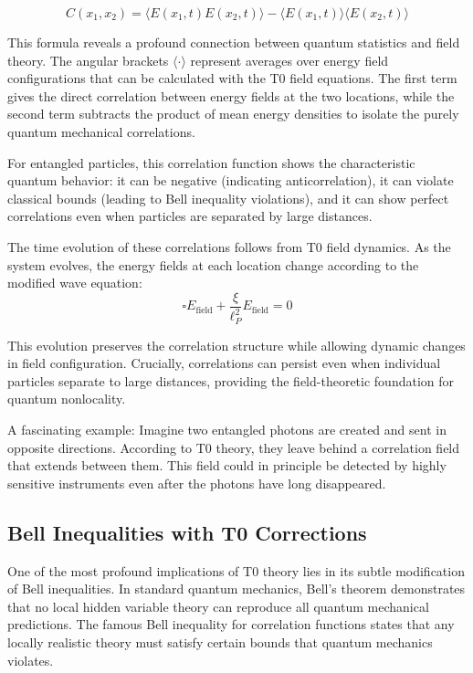 \documentclass[12pt,a4paper]{article}
\newcommand{\xipar}{\xi}
\theoremstyle{definition}
\theoremstyle{remark}
\begin{document}
\begin{equation}
	C(x_1,x_2) = \langle E(x_1,t) E(x_2,t) \rangle - \langle E(x_1,t) \rangle \langle E(x_2,t) \rangle
	\label{eq:field_correlation_function}
\end{equation}

This formula reveals a profound connection between quantum statistics and field theory. The angular brackets $\langle \cdot \rangle$ represent averages over energy field configurations that can be calculated with the T0 field equations. The first term gives the direct correlation between energy fields at the two locations, while the second term subtracts the product of mean energy densities to isolate the purely quantum mechanical correlations.

For entangled particles, this correlation function shows the characteristic quantum behavior: it can be negative (indicating anticorrelation), it can violate classical bounds (leading to Bell inequality violations), and it can show perfect correlations even when particles are separated by large distances.

The time evolution of these correlations follows from T0 field dynamics. As the system evolves, the energy fields at each location change according to the modified wave equation:
$$\square E_{\text{field}} + \frac{\xipar}{\ell_P^2} E_{\text{field}} = 0$$

This evolution preserves the correlation structure while allowing dynamic changes in field configuration. Crucially, correlations can persist even when individual particles separate to large distances, providing the field-theoretic foundation for quantum nonlocality.

A fascinating example: Imagine two entangled photons are created and sent in opposite directions. According to T0 theory, they leave behind a correlation field that extends between them. This field could in principle be detected by highly sensitive instruments even after the photons have long disappeared.

\subsection{Bell Inequalities with T0 Corrections}

One of the most profound implications of T0 theory lies in its subtle modification of Bell inequalities. In standard quantum mechanics, Bell's theorem demonstrates that no local hidden variable theory can reproduce all quantum mechanical predictions. The famous Bell inequality for correlation functions states that any locally realistic theory must satisfy certain bounds that quantum mechanics violates.
\end{document}
